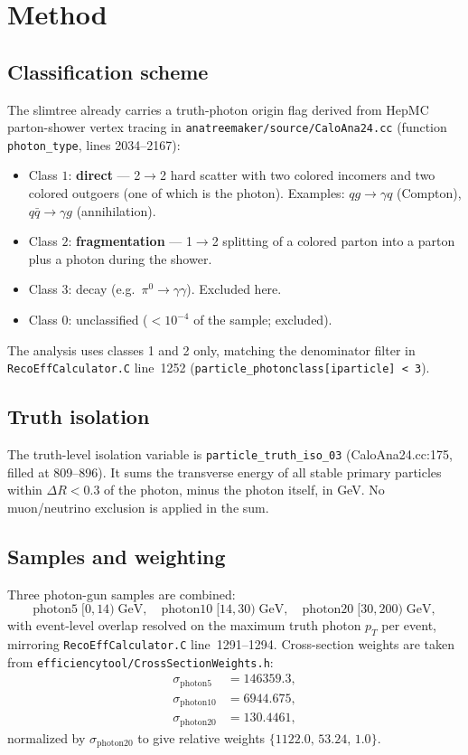 \documentclass[11pt,a4paper]{article}
\begin{document}
\section{Method}
\label{sec:method}

\subsection{Classification scheme}
\label{sec:method:class}

The slimtree already carries a truth-photon origin flag derived from HepMC parton-shower vertex tracing in \texttt{anatreemaker/source/\-Calo\-Ana24.\-cc} (function \texttt{photon\_type}, lines 2034--2167):
\begin{itemize}
\item Class $1$: \textbf{direct} --- 2$\to$2 hard scatter with two colored incomers and two colored outgoers (one of which is the photon).  Examples: $qg\to\gamma q$ (Compton), $q\bar q\to\gamma g$ (annihilation).
\item Class $2$: \textbf{fragmentation} --- 1$\to$2 splitting of a colored parton into a parton plus a photon during the shower.
\item Class $3$: decay (e.g.\ $\pi^0\to\gamma\gamma$). Excluded here.
\item Class $0$: unclassified ($<10^{-4}$ of the sample; excluded).
\end{itemize}
The analysis uses classes 1 and 2 only, matching the denominator filter in \texttt{RecoEffCalculator.C} line~1252 (\texttt{particle\_photonclass[iparticle] < 3}).

\subsection{Truth isolation}
\label{sec:method:iso}

The truth-level isolation variable is \texttt{particle\_truth\_iso\_03} (CaloAna24.cc:175, filled at 809--896).  It sums the transverse energy of all stable primary particles within $\Delta R<0.3$ of the photon, minus the photon itself, in GeV.  No muon/neutrino exclusion is applied in the sum.

\subsection{Samples and weighting}
\label{sec:method:samples}

Three photon-gun samples are combined:
\[
\text{photon5}\;[0,14)\;\text{GeV},\quad \text{photon10}\;[14,30)\;\text{GeV},\quad \text{photon20}\;[30,200)\;\text{GeV},
\]
with event-level overlap resolved on the maximum truth photon $p_T$ per event, mirroring \texttt{RecoEffCalculator.C} line~1291--1294.  Cross-section weights are taken from \texttt{efficiencytool/\-Cross\-Section\-Weights.\-h}:
\begin{align*}
\sigma_{\text{photon5}}  &= 146359.3, \\
\sigma_{\text{photon10}} &= 6944.675, \\
\sigma_{\text{photon20}} &= 130.4461,
\end{align*}
normalized by $\sigma_{\text{photon20}}$ to give relative weights $\{1122.0,\,53.24,\,1.0\}$.
\end{document}
